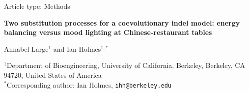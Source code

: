 \documentclass[11pt]{article}
\begin{document}
\doublespacing
\linenumbers

\begin{singlespace}
\thispagestyle{empty}
\begin{center}
{\normalsize Article type: Methods\par}
\vspace{1.5em}
{\Large\bfseries Two substitution processes for a coevolutionary indel model:
energy balancing versus mood lighting at Chinese-restaurant tables\par}
\vspace{1.5em}
{\large Annabel Large$^{1}$ and Ian Holmes$^{1,\ast}$\par}
\vspace{1.2em}
\begin{minipage}{0.85\textwidth}\centering
$^{1}$Department of Bioengineering, University of California, Berkeley,
Berkeley, CA 94720, United States of America\\[0.6em]
$^{\ast}$Corresponding author: Ian Holmes, \texttt{ihh@berkeley.edu}
\end{minipage}
\end{center}
\end{singlespace}

\vspace{2em}
\end{document}
